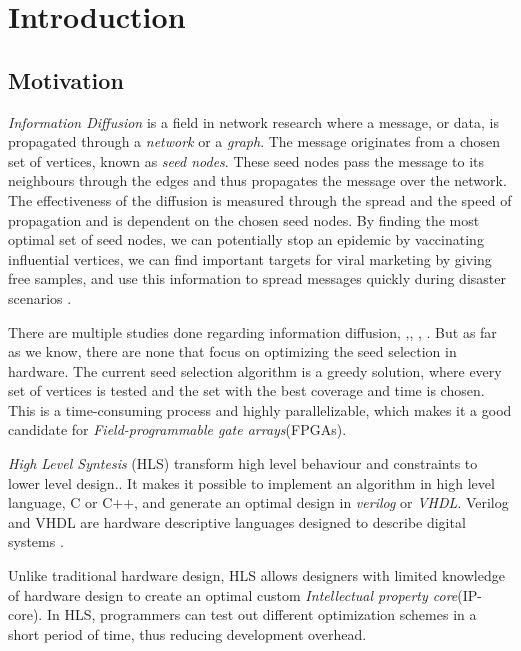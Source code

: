 \chapter{Introduction} \label{intro}

\section{Motivation}
\textit{Information Diffusion} is a field in network research where a message, or data, is propagated through a \textit{network} or a \textit{graph}. The message originates from a chosen set of vertices, known as \textit{seed nodes}. These seed nodes pass the message to its neighbours through the edges and thus propagates the message over the network. The effectiveness of the diffusion is measured through the spread and the speed of propagation and is dependent on the chosen seed nodes. By finding the most optimal set of seed nodes, we can potentially stop an epidemic by vaccinating influential vertices, we can find important targets for viral marketing by giving free samples, and use this information to spread messages quickly during disaster scenarios\cite{InformationDiffusionThroughBlogspace} \cite{Romero:2011:DMI:1963405.1963503}.

There are multiple studies done regarding information diffusion, \cite{InformationDiffusionThroughBlogspace},\cite{cha2010measuring},  \cite{5694014},  \cite{InfoDiffAndExternalInfluInNetworks}. But as far as we know, there are none that focus on optimizing the seed selection in hardware. The current seed selection algorithm is a greedy solution\cite{greedyInfluenc2005}, where every set of vertices is tested and the set with the best coverage and time is chosen. This is a time-consuming process and highly parallelizable, which makes it a good candidate for \textit{Field-programmable gate arrays}(FPGAs). 

\textit{High Level Syntesis} (HLS) transform high level behaviour and constraints to lower level design.\cite{52214}. It makes it possible to implement an algorithm in high level language, C or C++, and generate an optimal design in \textit{verilog} or \textit{VHDL}. Verilog and VHDL are hardware descriptive languages designed to describe digital systems \cite{thomas2008verilog}. 

Unlike traditional hardware design, HLS allows designers with limited knowledge of hardware design to create an optimal custom \textit{Intellectual property core}(IP-core). In HLS, programmers can test out different optimization schemes in a short period of time, thus reducing development overhead.  

